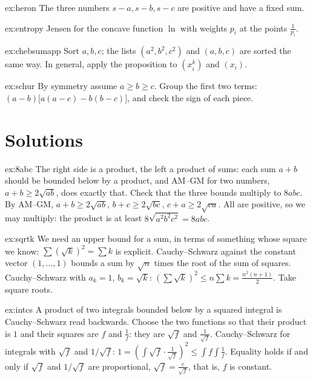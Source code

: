 \begin{hint}{ex:heron}
The three numbers $s-a,s-b,s-c$ are positive and have a fixed sum.
\end{hint}
\begin{hint}{ex:entropy}
Jensen for the concave function $\ln$ with weights $p_i$ at the points $\frac1{p_i}$.
\end{hint}
\begin{hint}{ex:chebsumapp}
Sort $a,b,c$; the lists $(a^2,b^2,c^2)$ and $(a,b,c)$ are sorted the same way. In general, apply the proposition to $(x_i^k)$ and $(x_i)$.
\end{hint}
\begin{hint}{ex:schur}
By symmetry assume $a\ge b\ge c$. Group the first two terms: $(a-b)\bigl[a(a-c)-b(b-c)\bigr]$, and check the sign of each piece.
\end{hint}

\section{Solutions}

\begin{solution}{ex:8abc}
\idea The right side is a product, the left a product of sums: each sum $a+b$ should be bounded below by a product, and AM--GM for two numbers, $a+b\ge2\sqrt{ab}$, does exactly that. Check that the three bounds multiply to $8abc$.
\writeup By AM--GM, $a+b\ge2\sqrt{ab}$, $b+c\ge2\sqrt{bc}$, $c+a\ge2\sqrt{ca}$. All are positive, so we may multiply: the product is at least $8\sqrt{a^2b^2c^2}=8abc$.
\end{solution}

\begin{solution}{ex:sqrtk}
\idea We need an upper bound for a sum, in terms of something whose square we know: $\sum(\sqrt k)^2=\sum k$ is explicit. Cauchy--Schwarz against the constant vector $(1,\dots,1)$ bounds a sum by $\sqrt n$ times the root of the sum of squares.
\writeup Cauchy--Schwarz with $a_k=1$, $b_k=\sqrt k$: $\left(\sum\sqrt k\right)^2\le n\sum k=\frac{n^2(n+1)}2$. Take square roots.
\end{solution}

\begin{solution}{ex:intcs}
\idea A product of two integrals bounded below by a squared integral is Cauchy--Schwarz read backwards. Choose the two functions so that their product is $1$ and their squares are $f$ and $\frac1f$: they are $\sqrt f$ and $\frac1{\sqrt f}$.
\writeup Cauchy--Schwarz for integrals with $\sqrt f$ and $1/\sqrt f$: $1=\left(\int\sqrt f\cdot\frac1{\sqrt f}\right)^2\le\int f\int\frac1f$.
Equality holds if and only if $\sqrt f$ and $1/\sqrt f$ are proportional, $\sqrt f=\frac c{\sqrt f}$, that is, $f$ is constant.
\end{solution}

